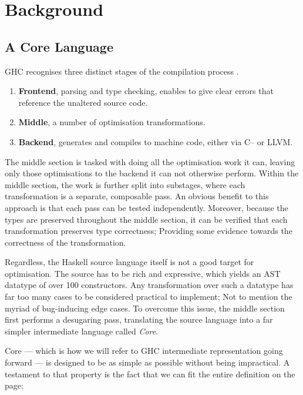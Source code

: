 \chapter{Background}

\section{A Core Language}
\label{section:background:core_lang}

GHC recognises three distinct stages of the compilation process \cite{haskell_optimisations_1997}.

\begin{enumerate}
  \item \textbf{Frontend}, parsing and type checking, enables to give clear errors that reference the unaltered source code.
  \item \textbf{Middle}, a number of optimisation transformations.
  \item \textbf{Backend}, generates and compiles to machine code, either via C-- or LLVM.
\end{enumerate}

The middle section is tasked with doing all the optimisation work it can, leaving only those optimisations to the backend
it can not otherwise perform. Within the middle section, the work is further split into substages, where each transformation
is a separate, composable pass. An obvious benefit to this approach is that each pass can be tested independently. Moreover, because
the types are preserved throughout the middle section, it can be verified that each transformation preserves type correctness;
Providing some evidence towards the correctness of the transformation.

Regardless, the Haskell source language itself is not a good target for optimisation. The source has to be
rich and expressive, which yields an AST datatype of over 100 constructors. Any transformation over such a datatype has far too
many cases to be considered practical to implement; Not to mention the myriad of bug-inducing edge cases. To overcome this issue, the
middle section first performs a desugaring pass, translating the source language into a far simpler intermediate language
called \textit{Core}. 

Core --- which is how we will refer to GHC intermediate representation going forward --- is designed to be as simple as possible
without being impractical. A testament to that property is the fact that we can fit the entire definition on the page:

